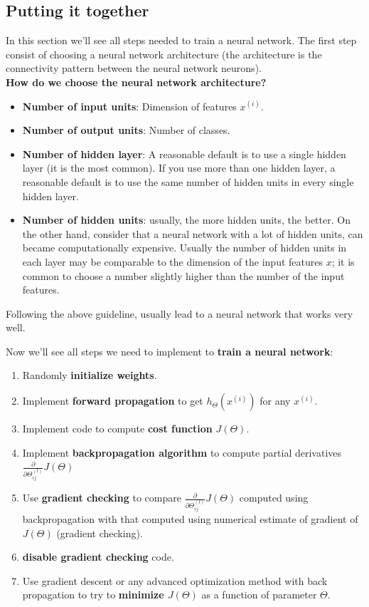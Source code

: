 \subsection{Putting it together}
In this section we'll see all steps needed to train a neural network. The first step consist of choosing a neural network architecture (the architecture is the connectivity pattern between the neural network neurons).\\
{\bf How do we choose the neural network architecture?}\\
\begin{itemize}
\item {\bf Number of input units}: Dimension of features $x^{(i)}$.
\item {\bf Number of output units}: Number of classes.
\item {\bf Number of hidden layer}: A reasonable default is to use a single hidden layer (it is the most common). If you use more than one hidden layer, a reasonable default is to use the same number of hidden units in every single hidden layer.
\item {\bf Number of hidden units}: usually, the more hidden units, the better. On the other hand, consider that a neural network with a lot of hidden units, can became computationally expensive. Usually the number of hidden units in each layer may be comparable to the dimension of the input features $x$; it is common to choose a number slightly higher than the number of the input features. 
\end{itemize}

Following the above guideline, usually lead to a neural network that works very well.

Now we'll see all steps we need to implement to {\bf train a neural network}:
\begin{enumerate}
\item Randomly {\bf initialize weights}.
\item Implement {\bf forward propagation} to get $h_\Theta(x^{(i)})$ for any $x^{(i)}$.
\item Implement code to compute {\bf cost function} $J(\Theta)$.
\item Implement {\bf backpropagation algorithm} to compute partial derivatives $\frac{\partial}{\partial \Theta_{ij}^{(l)}}J(\Theta)$
\item Use {\bf gradient checking} to compare $\frac{\partial}{\partial \Theta_{ij}^{(l)}}J(\Theta)$ computed using backpropagation with that computed using numerical estimate of gradient of $J(\Theta)$ (gradient checking).
\item {\bf disable gradient checking} code.
\item Use gradient descent or any advanced optimization method with back propagation to try to {\bf minimize $J(\Theta)$} as a function of parameter $\Theta$.
\end{enumerate}

